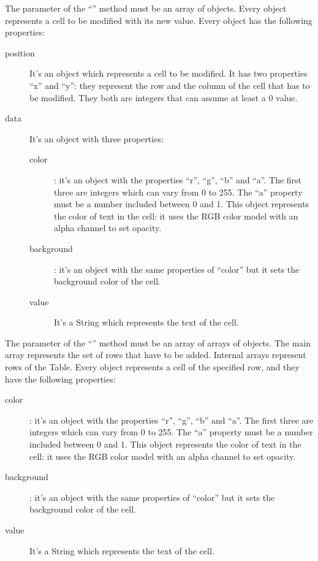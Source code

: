 				The parameter of the “” method must be an array of objects. Every object represents a cell to be modified with its new value. Every object has the following properties:
				\begin{description}
					\item[position] It's an object which represents a cell to be modified. It has two properties “x” and “y”: they represent the row and the column of the cell that has to be modified. They both are integers that can assume at least a 0 value.
					\item[data] It's an object with three properties:
					\begin{description}
						\item[color]: it's an object with the properties “r”, “g”, “b” and “a”. The first three are integers which can vary from 0 to 255. The “a” property must be a number included between 0 and 1.
						This object represents the color of text in the cell: it uses the RGB color model with an alpha channel to set opacity.
						\item[background]: it's an object with the same properties of “color” but it sets the background color of the cell.
						\item[value] It's a String which represents the text of the cell.
					\end{description}
				\end{description}
				The parameter of the “” method must be an array of arrays of objects. The main array represents the set of rows that have to be added. Internal arrays represent rows of the Table. Every object represents a cell of the specified row, and they have the following properties:
				\begin{description}
					\item[color]: it's an object with the properties “r”, “g”, “b” and “a”. The first three are integers which can vary from 0 to 255. The “a” property must be a number included between 0 and 1.
					This object represents the color of text in the cell: it uses the RGB color model with an alpha channel to set opacity.
					\item[background]: it's an object with the same properties of “color” but it sets the background color of the cell.
					\item[value] It's a String which represents the text of the cell.
				\end{description}